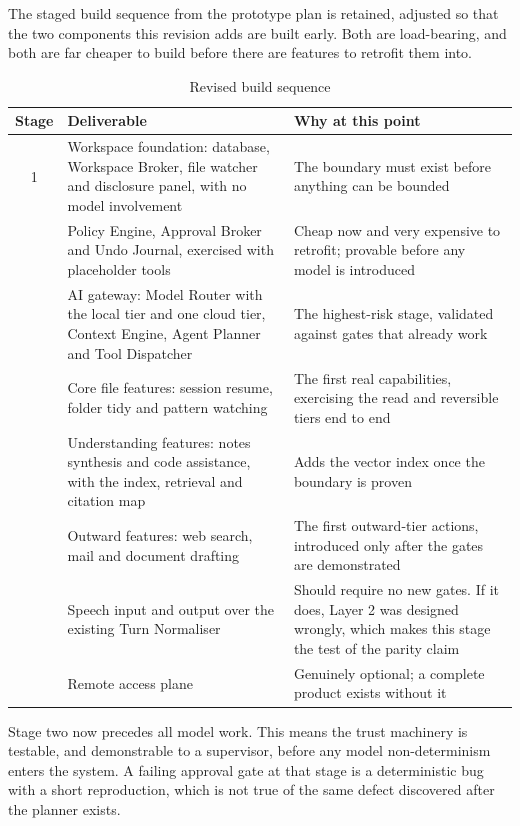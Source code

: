 \documentclass[11pt]{article}
\begin{document}
The staged build sequence from the prototype plan is retained, adjusted so that the two
components this revision adds are built early. Both are load-bearing, and both are far
cheaper to build before there are features to retrofit them into.

\begin{table}[htbp]
\centering
\small
\caption{Revised build sequence}
\label{tab:build}
\begin{tabular}{@{}cp{}p{}@{}}
\toprule
\textbf{Stage} & \textbf{Deliverable} & \textbf{Why at this point} \\
\midrule
1 & Workspace foundation: database, Workspace Broker, file watcher and disclosure panel, with no model involvement & The boundary must exist before anything can be bounded \\
\addlinespace
2 & Policy Engine, Approval Broker and Undo Journal, exercised with placeholder tools & Cheap now and very expensive to retrofit; provable before any model is introduced \\
\addlinespace
3 & AI gateway: Model Router with the local tier and one cloud tier, Context Engine, Agent Planner and Tool Dispatcher & The highest-risk stage, validated against gates that already work \\
\addlinespace
4 & Core file features: session resume, folder tidy and pattern watching & The first real capabilities, exercising the read and reversible tiers end to end \\
\addlinespace
5 & Understanding features: notes synthesis and code assistance, with the index, retrieval and citation map & Adds the vector index once the boundary is proven \\
\addlinespace
6 & Outward features: web search, mail and document drafting & The first outward-tier actions, introduced only after the gates are demonstrated \\
\addlinespace
7 & Speech input and output over the existing Turn Normaliser & Should require no new gates. If it does, Layer 2 was designed wrongly, which makes this stage the test of the parity claim \\
\addlinespace
8 & Remote access plane & Genuinely optional; a complete product exists without it \\
\bottomrule
\end{tabular}
\end{table}

\begin{finding}
Stage two now precedes all model work. This means the trust machinery is testable, and
demonstrable to a supervisor, before any model non-determinism enters the system. A
failing approval gate at that stage is a deterministic bug with a short reproduction,
which is not true of the same defect discovered after the planner exists.
\end{finding}
\end{document}

